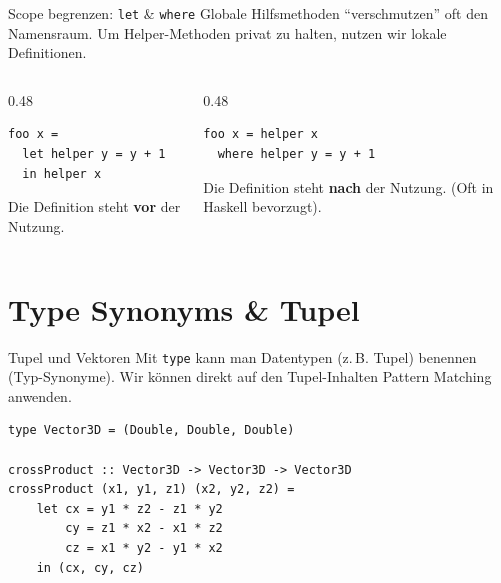 \documentclass[aspectratio=169,11pt]{beamer}
\begin{document}
\begin{frame}[fragile]{Scope begrenzen: \texttt{let} \& \texttt{where}}
    Globale Hilfsmethoden ``verschmutzen'' oft den Namensraum. Um Helper-Methoden privat zu halten, nutzen wir lokale Definitionen.
    
    \begin{columns}[T]
        \begin{column}{0.48\textwidth}
            \begin{tcolorbox}[modernbox, title=Mit \texttt{let ... in}]
\begin{lstlisting}
foo x = 
  let helper y = y + 1 
  in helper x
\end{lstlisting}
            \end{tcolorbox}
            \small Die Definition steht \textbf{vor} der Nutzung.
        \end{column}
        \begin{column}{0.48\textwidth}
            \begin{tcolorbox}[modernbox, title=Mit \texttt{where}]
\begin{lstlisting}
foo x = helper x
  where helper y = y + 1
\end{lstlisting}
            \end{tcolorbox}
            \small Die Definition steht \textbf{nach} der Nutzung. (Oft in Haskell bevorzugt).
        \end{column}
    \end{columns}
\end{frame}

\section{Type Synonyms \& Tupel}

\begin{frame}[fragile]{Tupel und Vektoren}
    Mit \texttt{type} kann man Datentypen (z.\,B. Tupel) benennen (Typ-Synonyme). Wir können direkt auf den Tupel-Inhalten Pattern Matching anwenden.
    
    \begin{tcolorbox}[modernbox, title=Beispiel: Kreuzprodukt]
\begin{lstlisting}
type Vector3D = (Double, Double, Double)

crossProduct :: Vector3D -> Vector3D -> Vector3D
crossProduct (x1, y1, z1) (x2, y2, z2) = 
    let cx = y1 * z2 - z1 * y2
        cy = z1 * x2 - x1 * z2
        cz = x1 * y2 - y1 * x2
    in (cx, cy, cz)
\end{lstlisting}
    \end{tcolorbox}
\end{frame}
\end{document}
